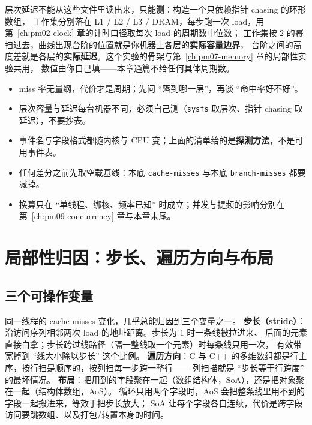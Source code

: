 \documentclass[12pt,a4paper,fontset=fandol]{ctexbook}
\newcommand{\Tp}[1]{\texttt{#1}}
\newcommand{\Bk}{\discretionary{}{}{}}
\newcommand{\Lang}[1]{\textsf{#1}}
\newcommand{\CL}{\Lang{C}}
\newcommand{\CPP}{\Lang{C++}}
\newcommand{\Mx}[1]{\textsf{#1}}
\begin{document}
层次延迟不能从这些文件里读出来，只能\textbf{测}：构造一个只依赖指针 chasing 的环形数组，
工作集分别落在 L1 / L2 / L3 / DRAM，每步跑一次 load，用第~\ref{ch:pm02-clock} 章的计时口径取每次 load 的周期数中位数；
工作集按 $2$ 的幂扫过去，曲线出现台阶的位置就是你机器上各层的\textbf{实际容量边界}，
台阶之间的高度差就是各层的\textbf{实际延迟}。这个实验的骨架与第~\ref{ch:pm07-memory} 章的局部性实验共用，
数值由你自己填——本章通篇不给任何具体周期数。

\begin{guideline}[title={要点：先换算，再谈命中率},label={box:pm06-cost}]
\begin{itemize}
\item miss 率无量纲，代价才是周期；先问 ``落到哪一层''，再谈 ``命中率好不好''。
\item 层次容量与延迟每台机器不同，必须自己测（\Tp{sysfs} 取层次、指针 chasing 取延迟），不要抄表。
\item 事件名与字段格式都随内核与 CPU 变；上面的清单给的是\textbf{探测方法}，不是可用事件表。
\item 任何差分之前先取空载基线：本底 \Tp{cache{\Bk}-misses} 与本底 \Tp{branch{\Bk}-misses} 都要减掉。
\item 换算只在 ``单线程、绑核、频率已知'' 时成立；并发与提频的影响分别在第~\ref{ch:pm09-concurrency} 章与本章末尾。
\end{itemize}
\end{guideline}

\section{局部性归因：步长、遍历方向与布局}
\label{sec:pm06-locality}

\subsection{三个可操作变量}

同一线程的 \Mx{cache{\Bk}-misses} 变化，几乎总能归因到三个变量之一。
\textbf{步长（stride）}：沿访问序列相邻两次 load 的地址距离。步长为 $1$ 时一条线被拉进来、
后面的元素直接白拿；步长跨过线路径（隔一整线取一个元素）时每条线只用一次，
有效带宽掉到 ``线大小除以步长'' 这个比例。
\textbf{遍历方向}：\CL{} 与 \CPP{} 的多维数组都是行主序，按行扫是顺序的，按列扫每一步跨一整行——
列扫描就是 ``步长等于行跨度'' 的最坏情况。
\textbf{布局}：把用到的字段聚在一起（数组结构体，SoA），还是把对象聚在一起（结构体数组，AoS）。
循环只用两个字段时，AoS 会把整条线里用不到的字段一起搬进来，等效于把步长放大；
SoA 让每个字段各自连续，代价是跨字段访问要跳数组、以及打包/转置本身的时间。
\end{document}
